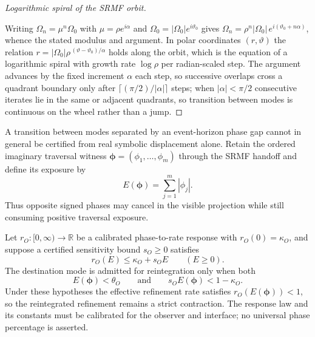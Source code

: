 \begin{proof}[Logarithmic spiral of the SRMF orbit]
\label{proof:bk4_spiral_transition}
\leavevmode

Writing $\Omega_n=\mu^n\Omega_0$ with $\mu=\rho e^{i\alpha}$ and
$\Omega_0=|\Omega_0|e^{i\vartheta_0}$ gives
$\Omega_n=\rho^{n}|\Omega_0|\,e^{i(\vartheta_0+n\alpha)}$, whence the stated modulus
and argument. In polar coordinates $(r,\vartheta)$ the relation
$r=|\Omega_0|\rho^{\,(\vartheta-\vartheta_0)/\alpha}$ holds along the orbit, which is
the equation of a logarithmic spiral with growth rate $\log\rho$ per radian-scaled
step. The argument advances by the fixed increment $\alpha$ each step, so successive
overlaps cross a quadrant boundary only after $\lceil(\pi/2)/|\alpha|\rceil$ steps;
when $|\alpha|<\pi/2$ consecutive iterates lie in the same or adjacent quadrants, so
transition between modes is continuous on the wheel rather than a jump.
\end{proof}

\begin{proposition}
\label{proposition:bk4_imagination_bridges_wheel}
A transition between modes separated by an event-horizon phase gap cannot in
general be certified from real symbolic displacement alone.  Retain the
ordered imaginary traversal witness
\(\mathbf{\phi}=(\phi_1,\ldots,\phi_m)\) through the SRMF handoff and define
its exposure by
\[
 E(\mathbf{\phi})=\sum_{j=1}^m |\phi_j|.
\]
Thus opposite signed phases may cancel in the visible projection while still
consuming positive traversal exposure.

Let \(r_O:[0,\infty)\to\mathbb R\) be a calibrated phase-to-rate response with
\(r_O(0)=\kappa_O\), and suppose a certified sensitivity bound \(s_O\ge 0\)
satisfies
\[
 r_O(E)\le \kappa_O+s_OE\qquad(E\ge0).
\]
The destination mode is admitted for reintegration only when both
\[
 E(\mathbf{\phi})<\theta_O
 \qquad\text{and}\qquad
 s_OE(\mathbf{\phi})<1-\kappa_O.
\]
Under these hypotheses the effective refinement rate satisfies
\(r_O(E(\mathbf{\phi}))<1\), so the reintegrated refinement remains a strict
contraction.  The response law and its constants must be calibrated for the
observer and interface; no universal phase percentage is asserted.
\end{proposition}

